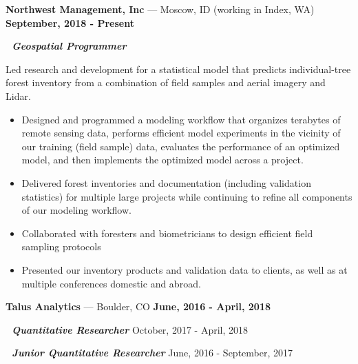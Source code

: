 \documentclass[10pt]{article} %
\begin{document}
\begin{small}

\noindent
\textbf{Northwest Management, Inc} ---  Moscow, ID (working in Index, WA) \hfill \textbf{September, 2018 - Present}$\,$

\noindent
\,\,
\textbf{\textit{Geospatial Programmer}} 

\noindent
Led research and development for a statistical model that predicts individual-tree forest inventory from a combination of field samples and aerial imagery and Lidar. 

\begin{itemize}[leftmargin = .35in,     noitemsep]
\item Designed and programmed a modeling workflow that organizes terabytes of remote sensing data, performs efficient
model experiments in the vicinity of our training (field sample) data, evaluates the performance of an optimized model,
and then implements the optimized model across a project. 
\item Delivered forest inventories and documentation (including validation statistics) for multiple large projects while
continuing to refine all components of our modeling workflow. 
\item Collaborated with foresters and biometricians to design efficient field sampling protocols 
\item Presented our inventory products and validation data to clients, as well as at multiple conferences domestic and abroad.
\end{itemize}

\vspace{1mm}
\noindent
\textbf{Talus Analytics} --- Boulder, CO  \hfill \textbf{June,  2016 - April, 2018}

\noindent
\,\,
\textbf{\textit{Quantitative Researcher}}  \hfill October,  2017 - April, 2018$\,$

\noindent
\,\,
\textbf{\textit{Junior Quantitative Researcher}} \hfill June, 2016 - September, 2017$\,$


\end{small}
\end{document}
